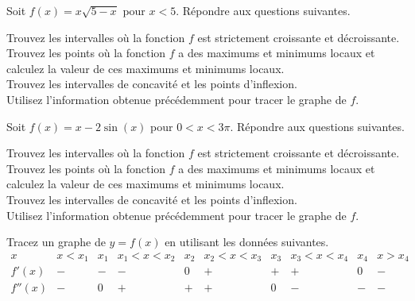 \begin{question}
Soit $\displaystyle f(x) = x\sqrt{5-x}$ pour $x<5$.  Répondre aux questions
suivantes.

 Trouvez les intervalles où la fonction $f$ est strictement
croissante et décroissante.\\
 Trouvez les points où la fonction $f$ a des maximums et
minimums locaux et calculez la valeur de ces maximums et minimums
locaux.\\
 Trouvez les intervalles de concavité et les points
d'inflexion.\\
 Utilisez l'information obtenue précédemment pour tracer le
graphe de $f$.
\label{6Q17}
\end{question}

\begin{question}[\life \eng]
Soit $\displaystyle f(x) = x - 2\sin(x)$ pour $0<x<3\pi$. Répondre aux
questions suivantes.

 Trouvez les intervalles où la fonction $f$ est strictement
croissante et décroissante.\\
 Trouvez les points où la fonction $f$ a des maximums et
minimums locaux et calculez la valeur de ces maximums et minimums
locaux.\\
 Trouvez les intervalles de concavité et les points
d'inflexion.\\
 Utilisez l'information obtenue précédemment pour tracer le
graphe de $f$.
\label{6Q18}
\end{question}

\begin{question}
Tracez un graphe de $y = f(x)$ en utilisant les données suivantes.
\[
\begin{array}{c|c|c|c|c|c|c|c|c|c}
x & x<x_1 & x_1 & x_1<x<x_2 & x_2 & x_2<x<x_3 & x_3 & x_3<x<x_4 &
x_4 & x>x_4 \\
\hline
f'(x) & - & - & - & 0 & + & + & + & 0 & - \\
f''(x) & - & 0 & + & + & + & 0 & - & - & -
\end{array}
\]
\label{6Q19}
\end{question}

